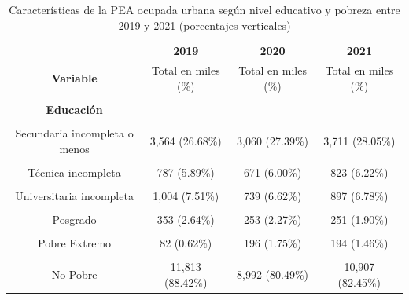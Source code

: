 \documentclass[
  letterpaper,
  12pt,
  oneside,
  spanish,
  doublespacing,
  headsepline,
  parskip]{MastersDoctoralThesis}
\begin{document}
\hypertarget{tbl-edpobre}{}
\begin{table}[H]
\caption{\label{tbl-edpobre}Características de la PEA ocupada urbana según nivel educativo y pobreza
entre 2019 y 2021 (porcentajes verticales) }\tabularnewline

\centering\begingroup\fontsize{10}{12}\selectfont

\begin{tabular}{cccc}
\toprule
\multicolumn{1}{c}{ } & \multicolumn{1}{c}{\textbf{2019}} & \multicolumn{1}{c}{\textbf{2020}} & \multicolumn{1}{c}{\textbf{2021}} \\
\cmidrule(l{3pt}r{3pt}){2-2} \cmidrule(l{3pt}r{3pt}){3-3} \cmidrule(l{3pt}r{3pt}){4-4}
\textbf{Variable} & Total en miles (\%) & Total en miles (\%) & Total en miles (\%)\\
\midrule
\cellcolor{gray!6}{\textbf{Nacional}} & \cellcolor{gray!6}{13,360 (100.00\%)} & \cellcolor{gray!6}{11,172 (100.00\%)} & \cellcolor{gray!6}{13,229 (100.00\%)}\\
\textbf{Educación} &  &  & \\
\cellcolor{gray!6}{Sin nivel} & \cellcolor{gray!6}{225 (1.68\%)} & \cellcolor{gray!6}{171 (1.54\%)} & \cellcolor{gray!6}{205 (1.55\%)}\\
Secundaria incompleta o menos & 3,564 (26.68\%) & 3,060 (27.39\%) & 3,711 (28.05\%)\\
\cellcolor{gray!6}{Secundaria completa} & \cellcolor{gray!6}{4,177 (31.27\%)} & \cellcolor{gray!6}{3,622 (32.43\%)} & \cellcolor{gray!6}{4,434 (33.51\%)}\\
\addlinespace
Técnica incompleta & 787 (5.89\%) & 671 (6.00\%) & 823 (6.22\%)\\
\cellcolor{gray!6}{Técnica completa} & \cellcolor{gray!6}{1,687 (12.63\%)} & \cellcolor{gray!6}{1,376 (12.32\%)} & \cellcolor{gray!6}{1,542 (11.66\%)}\\
Universitaria incompleta & 1,004 (7.51\%) & 739 (6.62\%) & 897 (6.78\%)\\
\cellcolor{gray!6}{Universitaria completa} & \cellcolor{gray!6}{1,563 (11.70\%)} & \cellcolor{gray!6}{1,279 (11.45\%)} & \cellcolor{gray!6}{1,366 (10.32\%)}\\
Posgrado & 353 (2.64\%) & 253 (2.27\%) & 251 (1.90\%)\\
\addlinespace
\cellcolor{gray!6}{\textbf{Pobreza}} & \cellcolor{gray!6}{} & \cellcolor{gray!6}{} & \cellcolor{gray!6}{}\\
Pobre Extremo & 82 (0.62\%) & 196 (1.75\%) & 194 (1.46\%)\\
\cellcolor{gray!6}{Pobre No Extremo} & \cellcolor{gray!6}{1,465 (10.97\%)} & \cellcolor{gray!6}{1,984 (17.76\%)} & \cellcolor{gray!6}{2,128 (16.09\%)}\\
No Pobre & 11,813 (88.42\%) & 8,992 (80.49\%) & 10,907 (82.45\%)\\
\bottomrule
\end{tabular}
\endgroup{}
\end{table}
\end{document}
